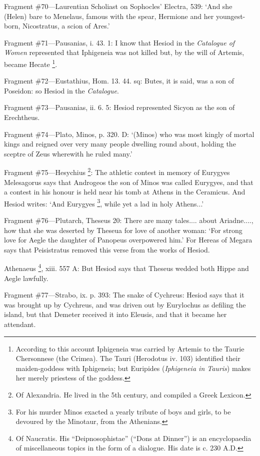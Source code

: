 Fragment \#70—Laurentian Scholiast on Sophocles’ Electra, 539:
‘And she (Helen) bare to Menelaus, famous with the spear, Hermione and
her youngest-born, Nicostratus, a scion of Ares.’

Fragment \#71—Pausanias, i. 43. 1: I know that Hesiod in the
\emph{Catalogue of Women} represented that Iphigeneia was not killed
but, by the will of Artemis, became Hecate \footnote{According to this account
Iphigeneia was carried by Artemis to the Taurie Chersonnese (the Crimea). The
Tauri (Herodotus iv. 103) identified their maiden-goddess with Iphigeneia; but
Euripides (\emph{Iphigeneia in Tauris}) makes her merely priestess of
the goddess.}.

Fragment \#72—Eustathius, Hom. 13. 44. sq: Butes, it is said, was a son of
Poseidon: so Hesiod in the \emph{Catalogue}.

Fragment \#73—Pausanias, ii. 6. 5: Hesiod represented Sicyon as the son of
Erechtheus.

Fragment \#74—Plato, Minos, p. 320. D: ‘(Minos) who was most kingly
of mortal kings and reigned over very many people dwelling round about, holding
the sceptre of Zeus wherewith he ruled many.’

Fragment \#75—Hesychius \footnote{Of Alexandria. He lived in
the 5th century, and compiled a Greek Lexicon.}: The athletic contest in memory
of Eurygyes Melesagorus says that Androgeos the son of Minos was called
Eurygyes, and that a contest in his honour is held near his tomb at Athens in
the Ceramicus. And Hesiod writes: ‘And Eurygyes \footnote{For his murder Minos
exacted a yearly tribute of boys and girls, to be devoured by the Minotaur,
from the Athenians.}, while
yet a lad in holy Athens...’

Fragment \#76—Plutarch, Theseus 20: There are many tales.... about
Ariadne...., how that she was deserted by Theseua for love of another woman:
‘For strong love for Aegle the daughter of Panopeus overpowered
him.’ For Hereas of Megara says that Peisistratus removed this verse from
the works of Hesiod.

Athenaeus \footnote{Of Naucratis. His
“Deipnosophistae” (“Dons at Dinner”) is an
encyclopaedia of miscellaneous topics in the form of a dialogue. His date is c.
230 A.D.}, xiii. 557 A: But Hesiod says
that Theseus wedded both Hippe and Aegle lawfully.

Fragment \#77—Strabo, ix. p. 393: The snake of Cychreus: Hesiod says that
it was brought up by Cychreus, and was driven out by Eurylochus as defiling the
island, but that Demeter received it into Eleusis, and that it became her
attendant.

